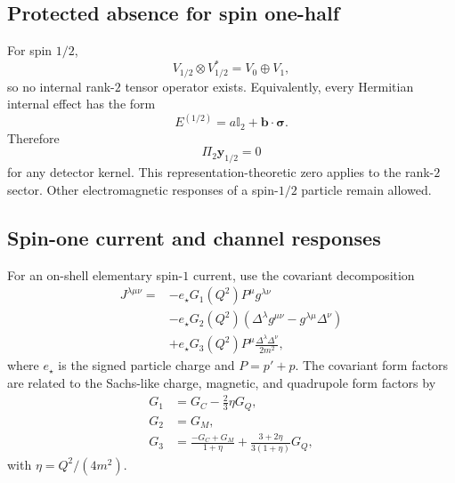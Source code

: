 \documentclass[12pt]{iopjournal}
\theoremstyle{definition}
\theoremstyle{remark}
\begin{document}
\subsection{Protected absence for spin one-half}

For spin $1/2$,
\begin{equation}
V_{1/2}\otimes V_{1/2}^*=V_0\oplus V_1,
\end{equation}
so no internal rank-$2$ tensor operator exists. Equivalently, every Hermitian internal effect has the form
\begin{equation}
E^{(1/2)}=a\mathbb I_2+\bm b\cdot\bm\sigma.
\end{equation}
Therefore
\begin{equation}
\boxed{\Pi_2\bm y_{1/2}=0}
\label{eq:spinhalf-rank2-zero}
\end{equation}
for any detector kernel. This representation-theoretic zero applies to the rank-$2$ sector. Other electromagnetic responses of a spin-$1/2$ particle remain allowed.

\subsection{Spin-one current and channel responses}

For an on-shell elementary spin-$1$ current, use the covariant decomposition \cite{Haberzettl2019}
\begin{align}
J^{\lambda\mu\nu}={}&
-e_\star G_1(Q^2)P^\mu g^{\lambda\nu}
\nonumber\\
&-e_\star G_2(Q^2)
(\Delta^\lambda g^{\mu\nu}-g^{\lambda\mu}\Delta^\nu)
\nonumber\\
&+e_\star G_3(Q^2)P^\mu
\frac{\Delta^\lambda\Delta^\nu}{2m^2},
\label{eq:spin1-current}
\end{align}
where $e_\star$ is the signed particle charge and $P=p'+p$. The covariant form factors are related to the Sachs-like charge, magnetic, and quadrupole form factors by
\begin{align}
G_1&=G_C-\frac23\eta G_Q,\\
G_2&=G_M,\\
G_3&=\frac{-G_C+G_M}{1+\eta}
+\frac{3+2\eta}{3(1+\eta)}G_Q,
\end{align}
with $\eta=Q^2/(4m^2)$.
\end{document}
